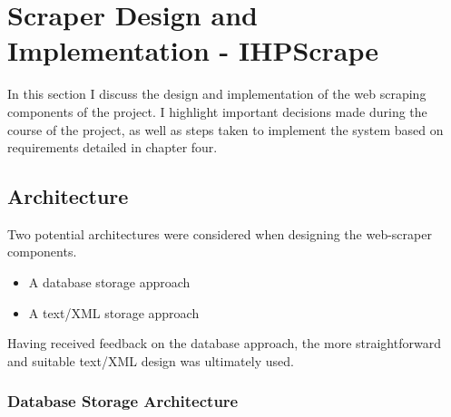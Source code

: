 \chapter{Scraper Design and Implementation - IHPScrape}\label{C:us}

In this section I discuss the design and implementation of the web scraping components of the project. I highlight important decisions made during the course of the project, as well as steps taken to implement the system based on requirements detailed in chapter four.






\section{Architecture}

Two potential architectures were considered when designing the web-scraper components.

\begin{itemize}
 \item A database storage approach
 \item A text/XML storage approach
\end{itemize}

Having received feedback on the database approach, the more straightforward and suitable text/XML design was ultimately used.

\subsection{Database Storage Architecture}

